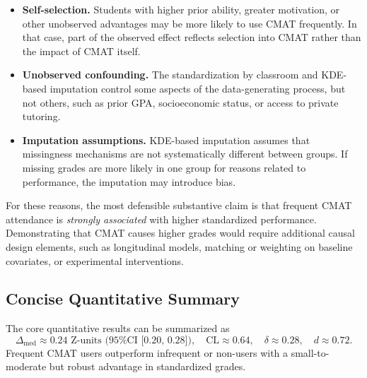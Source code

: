 \documentclass[8pt,a4paper]{article} %
\numberwithin{figure}{subsection}
\begin{document}
\begin{itemize}
  \item \textbf{Self-selection.} Students with higher prior ability,
        greater motivation, or other unobserved advantages may be
        more likely to use CMAT frequently. In that case, part of
        the observed effect reflects selection into CMAT rather
        than the impact of CMAT itself.
  \item \textbf{Unobserved confounding.} The standardization by
        classroom and KDE-based imputation control some aspects of
        the data-generating process, but not others, such as prior
        GPA, socioeconomic status, or access to private tutoring.
  \item \textbf{Imputation assumptions.} KDE-based imputation
        assumes that missingness mechanisms are not systematically
        different between groups. If missing grades are more likely
        in one group for reasons related to performance, the
        imputation may introduce bias.
\end{itemize}

For these reasons, the most defensible substantive claim is that
frequent CMAT attendance is \emph{strongly associated} with higher
standardized performance. Demonstrating that CMAT causes higher
grades would require additional causal design elements, such as
longitudinal models, matching or weighting on baseline covariates,
or experimental interventions.

\subsection{Concise Quantitative Summary}

The core quantitative results can be summarized as
\[
\boxed{
  \Delta_{\text{med}} \approx 0.24 \text{ Z-units (95\% CI [0.20, 0.28])},\quad
  \text{CL} \approx 0.64,\quad
  \delta \approx 0.28,\quad
  d \approx 0.72.
}
\]
Frequent CMAT users outperform infrequent or non-users with a
small-to-moderate but robust advantage in standardized grades.
\end{document}

